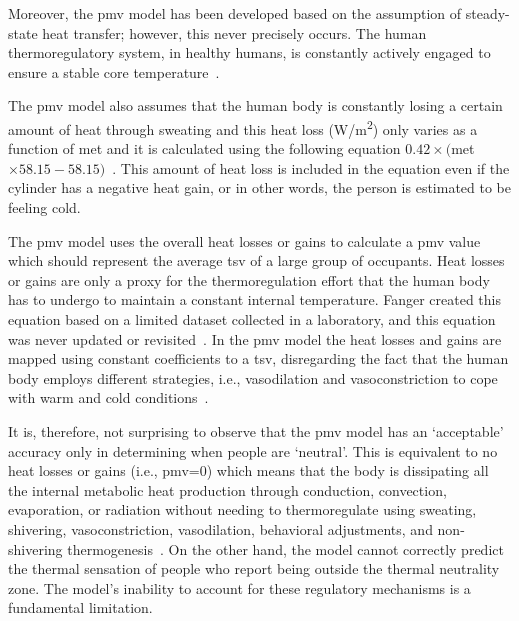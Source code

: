 Moreover, the \ac{pmv} model has been developed based on the assumption of steady-state heat transfer; however, this never precisely occurs.
The human thermoregulatory system, in healthy humans, is constantly actively engaged to ensure a stable core temperature~\cite{romanovsky_thermoregulation_2018}.

The \ac{pmv} model also assumes that the human body is constantly losing a certain amount of heat through sweating and this heat loss (W/m\textsuperscript{2}) only varies as a function of \ac{met} and it is calculated using the following equation $0.42\times($\ac{met}$\times58.15 - 58.15)$~\cite{Fanger1970}.
This amount of heat loss is included in the equation even if the cylinder has a negative heat gain, or in other words, the person is estimated to be feeling cold.

The \ac{pmv} model uses the overall heat losses or gains to calculate a \ac{pmv} value which should represent the average \ac{tsv} of a large group of occupants.
Heat losses or gains are only a proxy for the thermoregulation effort that the human body has to undergo to maintain a constant internal temperature.
Fanger created this equation based on a limited dataset collected in a laboratory, and this equation was never updated or revisited~\cite{Fanger1970}.
In the \ac{pmv} model the heat losses and gains are mapped using constant coefficients to a \ac{tsv}, disregarding the fact that the human body employs different strategies, i.e., vasodilation and vasoconstriction to cope with warm and cold conditions~\cite{romanovsky_thermoregulation_2018}.

It is, therefore, not surprising to observe that the \ac{pmv} model has an `acceptable' accuracy only in determining when people are `neutral'.
This is equivalent to no heat losses or gains (i.e., \ac{pmv}=0) which means that the body is dissipating all the internal metabolic heat production through conduction, convection, evaporation, or radiation without needing to thermoregulate using sweating, shivering, vasoconstriction, vasodilation, behavioral adjustments, and non-shivering thermogenesis~\cite{ romanovsky_thermoregulation_2018}.
On the other hand, the model cannot correctly predict the thermal sensation of people who report being outside the thermal neutrality zone.
The model's inability to account for these regulatory mechanisms is a fundamental limitation.

